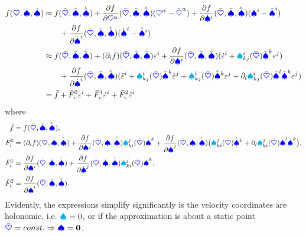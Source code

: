 \begin{align}
 f(\sysCoord, \sysVel, \sysVeld) 
  &\approx f(\sysCoordB, \sysVelB, \sysVelBd) 
  + \pdiff[f]{\sysCoordCoeff{\GidxI}}(\sysCoordB, \sysVelB, \sysVelBd) (\sysCoordCoeff{\GidxI} - \sysCoordCoeffB{\GidxI})
  + \pdiff[f]{\sysVelCoeff{\LidxI}}(\sysCoordB, \sysVelB, \sysVelBd) (\sysVelCoeff{\LidxI} - \sysVelCoeffB{\LidxI})
\nonumber\\
  &\qquad + \pdiff[f]{\sysVelCoeffd{\LidxI}}(\sysCoordB, \sysVelB, \sysVelBd) (\sysVelCoeffd{\LidxI} - \sysVelCoeffBd{\LidxI})
\nonumber\\
  &\approx f(\sysCoordB, \sysVelB, \sysVelBd) 
  + (\dirDiff{\LidxI}f) (\sysCoordB, \sysVelB, \sysVelBd) \LinErrorCoordCoeff{\LidxI}
  + \pdiff[f]{\sysVelCoeff{\LidxI}}(\sysCoordB, \sysVelB, \sysVelBd) (\LinErrorCoordCoeffd{\LidxI} + \BoltzSym{\LidxI}{\LidxIII}{\LidxII}(\sysCoordB) \sysVelCoeffB{\LidxIII} \LinErrorCoordCoeff{\LidxII})
\nonumber\\
  &\qquad 
  + \pdiff[f]{\sysVelCoeffd{\LidxI}}(\sysCoordB, \sysVelB, \sysVelBd) (\LinErrorCoordCoeffdd{\LidxI} + \BoltzSym{\LidxI}{\LidxIII}{\LidxII}(\sysCoordB) \sysVelCoeffB{\LidxIII} \LinErrorCoordCoeffd{\LidxII}  + \BoltzSym{\LidxI}{\LidxIII}{\LidxII}(\sysCoordB) \sysVelCoeffBd{\LidxIII} \LinErrorCoordCoeff{\LidxII}  + \dirDiff{\LidxIV}\BoltzSym{\LidxI}{\LidxIII}{\LidxII}(\sysCoordB) \sysVelCoeffB{\LidxIV} \sysVelCoeffB{\LidxIII} \LinErrorCoordCoeff{\LidxII})
\nonumber\\
 &= \bar{f} + \bar{F}^0_\LidxI \LinErrorCoordCoeff{\LidxI} + \bar{F}^1_\LidxI \LinErrorCoordCoeffd{\LidxI} + \bar{F}^2_\LidxI \LinErrorCoordCoeffdd{\LidxI}
\end{align}
where
\begin{align*}
 \bar{f} &= f(\sysCoordB, \sysVelB, \sysVelBd),
\\
 \bar{F}^0_\LidxI &= (\dirDiff{\LidxI}f) (\sysCoordB, \sysVelB, \sysVelBd) + \pdiff[f]{\sysVelCoeff{\LidxII}}(\sysCoordB, \sysVelB, \sysVelBd) \BoltzSym{\LidxII}{\LidxIII}{\LidxI}(\sysCoordB) \sysVelCoeffB{\LidxIII} + \pdiff[f]{\sysVelCoeffd{\LidxII}}(\sysCoordB, \sysVelB, \sysVelBd) \big( \BoltzSym{\LidxII}{\LidxIII}{\LidxI}(\sysCoordB) \sysVelCoeffBd{\LidxIII} + \dirDiff{\LidxIV}\BoltzSym{\LidxII}{\LidxIII}{\LidxI}(\sysCoordB) \sysVelCoeffB{\LidxIV} \sysVelCoeffB{\LidxIII} \big),
\\
 \bar{F}^1_\LidxI &= \pdiff[f]{\sysVelCoeff{\LidxI}}(\sysCoordB, \sysVelB, \sysVelBd) + \pdiff[f]{\sysVelCoeffd{\LidxII}}(\sysCoordB, \sysVelB, \sysVelBd) \BoltzSym{\LidxII}{\LidxIII}{\LidxI}(\sysCoordB) \sysVelCoeffB{\LidxIII},
\\
 \bar{F}^2_\LidxI &= \pdiff[f]{\sysVelCoeffd{\LidxI}}(\sysCoordB, \sysVelB, \sysVelBd).
\end{align*}
Evidently, the expressions simplify significantly is the velocity coordinates are holonomic, i.e. $\BoltzSym{}{}{} = 0$, or if the approximation is about a static point $\sysCoordB = \const \Rightarrow \sysVel = \tuple{0}$.


